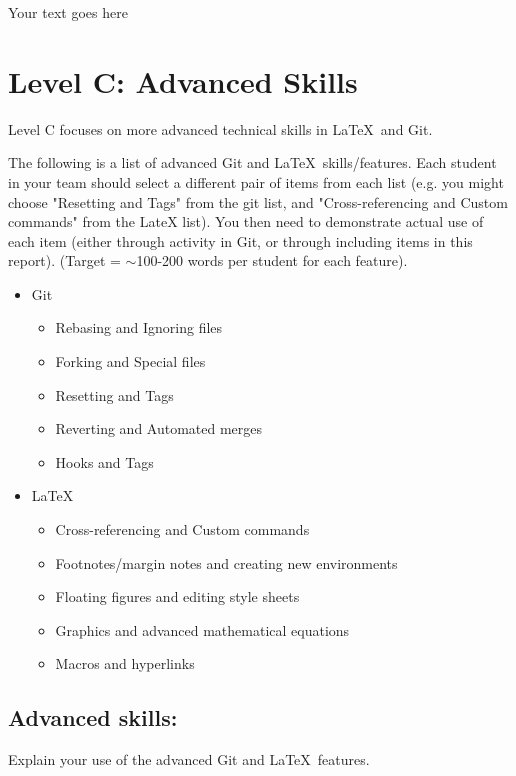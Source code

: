 \documentclass[a4paper, 11pt]{report}
\begin{document}
Your text goes here



\newpage
\section{Level C: Advanced Skills}

Level C focuses on more advanced technical skills in \LaTeX\ and Git.

The following is a list of advanced Git and \LaTeX\ skills/features. Each student in your team should select a different pair of items from each list (e.g. you might choose "Resetting and Tags" from the git list, and "Cross-referencing and Custom commands" from the LateX list). You then need to demonstrate actual use of each item (either through activity in Git, or through including items in this report). (Target = $\sim$100-200 words per student for each feature).
\begin{itemize}
	\item Git
	\begin{itemize}
		\item Rebasing and Ignoring files
		\item Forking and Special files
		\item Resetting and Tags
		\item Reverting and Automated merges
		\item Hooks and Tags
	\end{itemize}
	\item \LaTeX\ 
	\begin{itemize}
		\item Cross-referencing and Custom commands
		\item Footnotes/margin notes and creating new environments
		\item Floating figures and editing style sheets
		\item Graphics and advanced mathematical equations
		\item Macros and hyperlinks
	\end{itemize}
\end{itemize}

\subsection{Advanced skills: \studA}

Explain your use of the advanced Git and \LaTeX\ features. 
\end{document}
